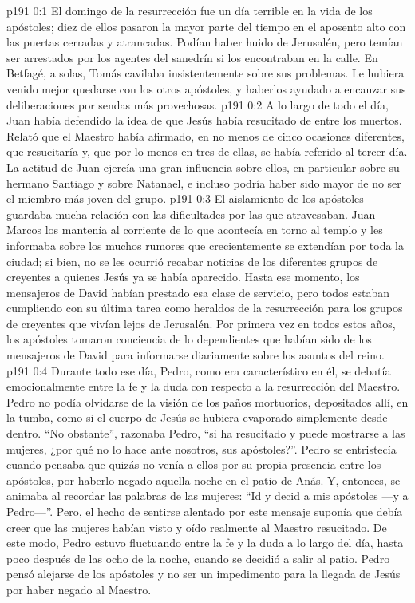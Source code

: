 \author{Comisión de seres intermedios}
\vs p191 0:1 El domingo de la resurrección fue un día terrible en la vida de los apóstoles; diez de ellos pasaron la mayor parte del tiempo en el aposento alto con las puertas cerradas y atrancadas. Podían haber huido de Jerusalén, pero temían ser arrestados por los agentes del sanedrín si los encontraban en la calle. En Betfagé, a solas, Tomás cavilaba insistentemente sobre sus problemas. Le hubiera venido mejor quedarse con los otros apóstoles, y haberlos ayudado a encauzar sus deliberaciones por sendas más provechosas.
\vs p191 0:2 A lo largo de todo el día, Juan había defendido la idea de que Jesús había resucitado de entre los muertos. Relató que el Maestro había afirmado, en no menos de cinco ocasiones diferentes, que resucitaría y, que por lo menos en tres de ellas, se había referido al tercer día. La actitud de Juan ejercía una gran influencia sobre ellos, en particular sobre su hermano Santiago y sobre Natanael, e incluso podría haber sido mayor de no ser el miembro más joven del grupo.
\vs p191 0:3 El aislamiento de los apóstoles guardaba mucha relación con las dificultades por las que atravesaban. Juan Marcos los mantenía al corriente de lo que acontecía en torno al templo y les informaba sobre los muchos rumores que crecientemente se extendían por toda la ciudad; si bien, no se les ocurrió recabar noticias de los diferentes grupos de creyentes a quienes Jesús ya se había aparecido. Hasta ese momento, los mensajeros de David habían prestado esa clase de servicio, pero todos estaban cumpliendo con su última tarea como heraldos de la resurrección para los grupos de creyentes que vivían lejos de Jerusalén. Por primera vez en todos estos años, los apóstoles tomaron conciencia de lo dependientes que habían sido de los mensajeros de David para informarse diariamente sobre los asuntos del reino.
\vs p191 0:4 Durante todo ese día, Pedro, como era característico en él, se debatía emocionalmente entre la fe y la duda con respecto a la resurrección del Maestro. Pedro no podía olvidarse de la visión de los paños mortuorios, depositados allí, en la tumba, como si el cuerpo de Jesús se hubiera evaporado simplemente desde dentro. “No obstante”, razonaba Pedro, “si ha resucitado y puede mostrarse a las mujeres, ¿por qué no lo hace ante nosotros, sus apóstoles?”. Pedro se entristecía cuando pensaba que quizás no venía a ellos por su propia presencia entre los apóstoles, por haberlo negado aquella noche en el patio de Anás. Y, entonces, se animaba al recordar las palabras de las mujeres: “Id y decid a mis apóstoles ---y a Pedro---”. Pero, el hecho de sentirse alentado por este mensaje suponía que debía creer que las mujeres habían visto y oído realmente al Maestro resucitado. De este modo, Pedro estuvo fluctuando entre la fe y la duda a lo largo del día, hasta poco después de las ocho de la noche, cuando se decidió a salir al patio. Pedro pensó alejarse de los apóstoles y no ser un impedimento para la llegada de Jesús por haber negado al Maestro.
